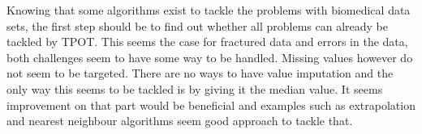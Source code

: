 \documentclass[10pt,a4paper]{article}
\begin{document}
	Knowing that some algorithms exist to tackle the problems with biomedical data sets, the first step should be to find out whether all problems can already be tackled by TPOT. This seems the case for fractured data and errors in the data, both challenges seem to have some way to be handled. Missing values however do not seem to be targeted. There are no ways to have value imputation and the only way this seems to be tackled is by giving it the median value. It seems improvement on that part would be beneficial and examples such as extrapolation and nearest neighbour algorithms seem good approach to tackle that.
	
	 
	
	
\end{document}
